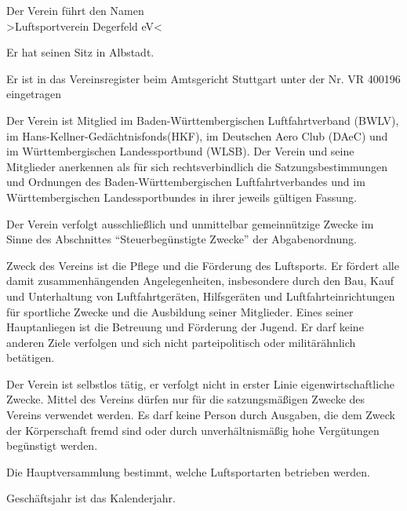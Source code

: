 \documentclass[11pt,a4paper,parskip=half]{scrartcl}
\begin{document}
  \begin{contract}
    \begin{multicols}{2}

    Der Verein führt den Namen\\
    >Luftsportverein Degerfeld eV<

    Er hat seinen Sitz in Albstadt.

    Er ist in das Vereinsregister beim Amtsgericht Stuttgart unter der Nr. VR 400196 eingetragen

    Der Verein ist Mitglied im Baden-Württembergischen Luftfahrtverband (BWLV),
    im Hans-Kellner-Gedächtnisfonds(HKF),
    im Deutschen Aero Club (DAeC) und im Württembergischen Landessportbund (WLSB).
    Der Verein und seine Mitglieder anerkennen als für sich rechtsverbindlich die Satzungsbestimmungen und Ordnungen des Baden-Württembergischen Luftfahrtverbandes und im Württembergischen Landessportbundes in ihrer jeweils gültigen Fassung.

    Der Verein verfolgt ausschließlich und unmittelbar gemeinnützige Zwecke im Sinne des Abschnittes "`Steuerbegünstigte Zwecke"' der Abgabenordnung.

    Zweck des Vereins ist die Pflege und die Förderung des Luftsports.
    Er fördert alle damit zusammenhängenden Angelegenheiten,
    insbesondere durch den Bau,
    Kauf und Unterhaltung von Luftfahrtgeräten,
    Hilfsgeräten und Luftfahrteinrichtungen für sportliche Zwecke und die Ausbildung seiner Mitglieder.
    Eines seiner Hauptanliegen ist die Betreuung und Förderung der Jugend.
    Er darf keine anderen Ziele verfolgen und sich nicht parteipolitisch oder militärähnlich betätigen.

    Der Verein ist selbstlos tätig,
    er verfolgt nicht in erster Linie eigenwirtschaftliche Zwecke.
    Mittel des Vereins dürfen nur für die satzungsmäßigen Zwecke des Vereins verwendet werden. Es darf keine Person durch Ausgaben,
    die dem Zweck der Körperschaft fremd sind oder durch unverhältnismäßig hohe Vergütungen begünstigt werden.

    Die Hauptversammlung bestimmt,
    welche Luftsportarten betrieben werden.

    Geschäftsjahr ist das Kalenderjahr.



\end{multicols}
\end{contract}
\end{document}
